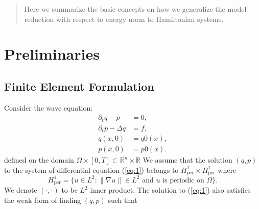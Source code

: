 \documentclass[12pt]{article}
\begin{document}
\maketitle

\begin{abstract}
Here we summarize the basic concepts on how we generalize the model reduction with respect to energy norm to Hamiltonian systems.
\end{abstract}

\section{Preliminaries}

\subsection{Finite Element Formulation}

Consider the wave equation:
\begin{equation} \label{eq:1}
\begin{aligned}
	\partial_t q - p &= 0, \\
	\partial_t p - \Delta q &= f,\\
	q(x,0) &= q0(x),\\
	p(x,0) &= p0(x).
\end{aligned}
\end{equation}
defined on the domain $\Omega\times [0,T] \subset \mathbb R^n \times \mathbb R$ We assume that the solution $(q,p)$ to the system of differential equation (\ref{eq:1}) belongs to $H^1_{\text{per}}\times H^1_{\text{per}}$ where
\begin{equation} \label{eq:4}
	H^1_{\text{per}} = \{ u \in L^2 : \|\nabla u\| \in L^2 \text{ and } u \text{ is periodic on }\Omega \}.
\end{equation}
We denote $(\cdot,\cdot)$ to be $L^2$ inner product. The solution to (\ref{eq:1}) also satisfies the weak form of finding $(q,p)$ such that
\end{document}
